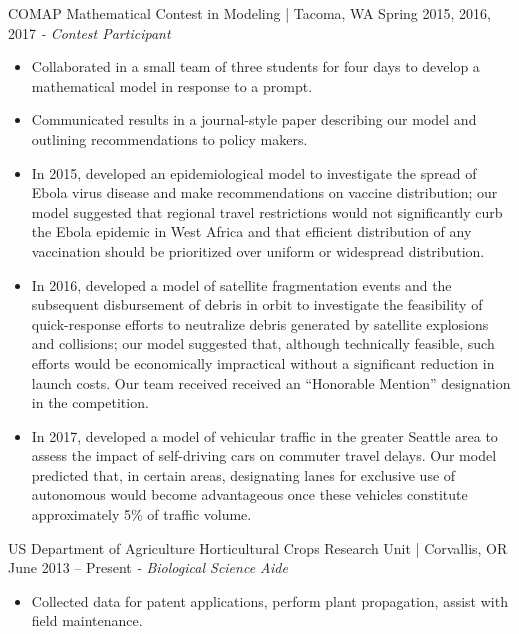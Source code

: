 COMAP Mathematical Contest in Modeling | Tacoma, WA \hfill Spring 2015, 2016, 2017 \newline
\textit{- Contest Participant} \\
  \vspace{-4.5mm}
 \begin{itemize}
 \item Collaborated in a small team of three students for four days to develop a mathematical model in response to a prompt.
 \item Communicated results in a journal-style paper describing our model and outlining recommendations to policy makers.
 \item In 2015, developed an epidemiological model to investigate the spread of Ebola virus disease and make recommendations on vaccine distribution; our model suggested that regional travel restrictions would not significantly curb the Ebola epidemic in West Africa and that efficient distribution of any vaccination should be prioritized over uniform or widespread distribution.
 \item In 2016, developed a model of satellite fragmentation events and the subsequent disbursement of debris in orbit to investigate the feasibility of quick-response efforts to neutralize debris generated by satellite explosions and collisions; our model suggested that, although technically feasible, such efforts would be economically impractical without a significant reduction in launch costs. Our team received received an ``Honorable Mention'' designation in the competition.
 \item In 2017, developed a model of vehicular traffic in the greater Seattle area to assess the impact of self-driving cars on commuter travel delays. Our model predicted that, in certain areas, designating lanes for exclusive use of autonomous would become advantageous once these vehicles constitute approximately 5\% of traffic volume.
 \end{itemize}
  \vspace{-3.5mm}

US Department of Agriculture Horticultural Crops Research Unit | Corvallis, OR  \hfill  June 2013 – Present \newline
\textit{- Biological Science Aide}\\
  \vspace{-4.5mm}
 \begin{itemize}
 \item Collected data for patent applications, perform plant propagation, assist with field maintenance.
 \end{itemize}
  \vspace{-3.5mm}
 
